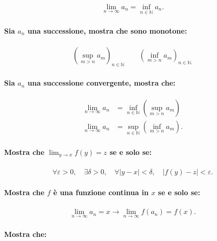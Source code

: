 \documentclass{article}
\begin{document}
\begin{align*}
\lim_{n \to \infty} a_n = \inf_{n \in {\mathbb N}} a_n.
\end{align*}

\paragraph{Sia $a_n$ una successione, mostra che sono monotone:}

\begin{align*}
\left(\sup_{m > n} a_m\right)_{n \in {\mathbb N}} \qquad \left(\inf_{m > n} a_m\right)_{n \in {\mathbb N}.}
\end{align*}

\paragraph{Sia $a_n$ una successione convergente, mostra che:}

\begin{align*}
\lim_{n \to \infty} a_n &= \inf_{n \in {\mathbb N}}\left(\sup_{m > n} a_m\right)\\
\lim_{n \to \infty} a_n &= \sup_{n \in {\mathbb N}}\left(\inf_{m > n} a_m\right).
\end{align*}

\paragraph{Mostra che $\lim_{y \rightarrow x} f(y) = z$ se e solo se:}

\begin{align*}
\forall \varepsilon > 0, \quad \exists \delta > 0, \quad \forall |y - x| < \delta, \quad |f(y) - z| < \varepsilon.
\end{align*}

\paragraph{Mostra che $f$ è una funzione continua in $x$ se e solo se:}

\begin{align*}
\lim_{n \to \infty} a_n = x \longrightarrow \lim_{n \to \infty} f(a_n) = f(x).
\end{align*}

\paragraph{Mostra che:}
\end{document}
